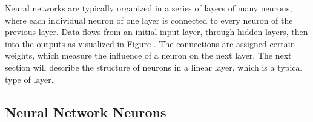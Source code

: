 \documentclass[12pt]{article}
\begin{document}
Neural networks are typically organized in a series of layers of many neurons, where each individual neuron of one layer is connected to every neuron of the previous layer. Data flows from an initial input layer, through hidden layers, then into the outputs as visualized in Figure \cite{fig:example-nn}. The connections are assigned certain weights, which measure the influence of a neuron on the next layer. The next section will describe the structure of neurons in a linear layer, which is a typical type of layer. %


\subsection{Neural Network Neurons}


\end{document}
